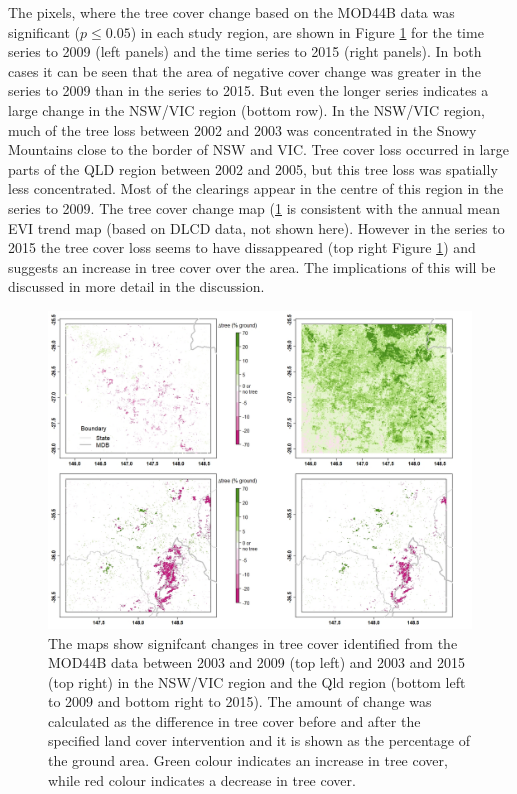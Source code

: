 \documentclass[]{elsarticle} %
\theoremstyle{definition}
\theoremstyle{definition}
\theoremstyle{definition}
\theoremstyle{remark}
\begin{document}
The pixels, where the tree cover change based on the MOD44B data was
significant (\(p \leq 0.05\)) in each study region, are shown in Figure
\ref{fig:tctrend} for the time series to 2009 (left panels) and the time
series to 2015 (right panels). In both cases it can be seen that the
area of negative cover change was greater in the series to 2009 than in
the series to 2015. But even the longer series indicates a large change
in the NSW/VIC region (bottom row). In the NSW/VIC region, much of the
tree loss between 2002 and 2003 was concentrated in the Snowy Mountains
close to the border of NSW and VIC. Tree cover loss occurred in large
parts of the QLD region between 2002 and 2005, but this tree loss was
spatially less concentrated. Most of the clearings appear in the centre
of this region in the series to 2009. The tree cover change map
(\ref{fig:tctrend} is consistent with the annual mean EVI trend map
(based on DLCD data, not shown here). However in the series to 2015 the
tree cover loss seems to have dissappeared (top right Figure
\ref{fig:tctrend}) and suggests an increase in tree cover over the area.
The implications of this will be discussed in more detail in the
discussion.

\begin{figure}
\includegraphics[width=0.9\linewidth]{figures/tc_figs} \caption{The maps show signifcant changes in tree cover identified from the MOD44B data between 2003 and 2009 (top left) and 2003 and 2015 (top right) in the NSW/VIC region and the Qld region (bottom left to 2009 and bottom right to 2015). The amount of change was calculated as the difference in tree cover before and after the specified land cover intervention and it is shown as the percentage of the ground area. Green colour indicates an increase in tree cover, while red colour indicates a decrease in tree cover.}\label{fig:tctrend}
\end{figure}
\end{document}
